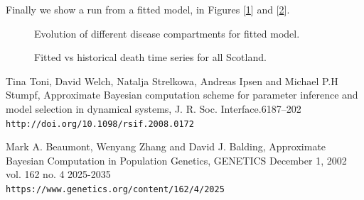 \documentclass[11pt]{article}
\begin{document}
Finally we show a run from a fitted model, in Figures [\ref{fig:fitted_model_run}] and [\ref{fig:fitted_model_total_vs_historical}].

\begin{figure}
  \caption{Evolution of different disease compartments for fitted model.}
  \label{fig:fitted_model_run}
\end{figure}

\begin{figure}
  \caption{Fitted vs historical death time series for all Scotland.}
  \label{fig:fitted_model_total_vs_historical}
\end{figure}

\begin{thebibliography}{9}
Tina Toni, David Welch, Natalja Strelkowa, Andreas Ipsen and Michael P.H Stumpf, Approximate Bayesian computation scheme for parameter inference and model selection in dynamical systems, J. R. Soc. Interface.6187–202
\\\texttt{http://doi.org/10.1098/rsif.2008.0172}

Mark A. Beaumont, Wenyang Zhang and David J. Balding, Approximate Bayesian Computation in Population Genetics, GENETICS December 1, 2002 vol. 162 no. 4 2025-2035 \\\texttt{https://www.genetics.org/content/162/4/2025}
\end{thebibliography}
\end{document}
